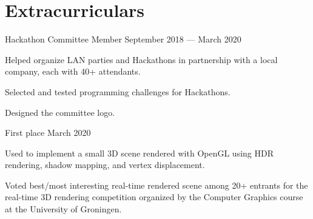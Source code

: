\section*{Extracurriculars}

\begin{cventries}
  {Hackathon Committee Member}
  {September 2018 --- March 2020}
  {}
  {%
    \begin{cvitems}
      \item Helped organize LAN parties and Hackathons in partnership with a local company, each with 40+ attendants.
      \item Selected and tested programming challenges for Hackathons.
      \item Designed the committee logo.
    \end{cvitems}
  }
  {First place}
  {March 2020}
  {}
  {%
    \begin{cvitems}
      \item Used  to implement a small 3D scene rendered with OpenGL using HDR rendering, shadow mapping, and vertex displacement.  \textbf{}
      \item Voted best/most interesting real-time rendered scene among 20+ entrants for the real-time 3D rendering competition organized by the Computer Graphics course at the University of Groningen.
    \end{cvitems}
  }
\end{cventries}

